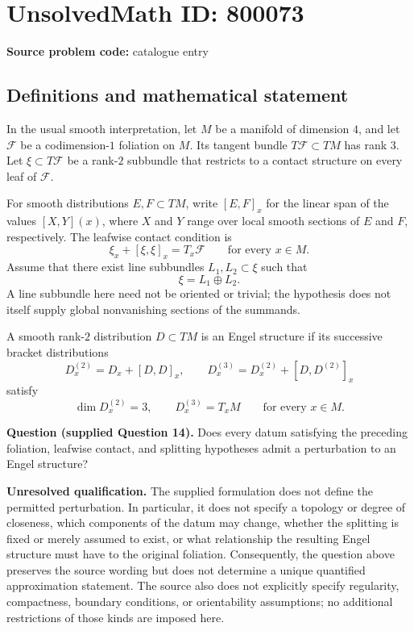 \documentclass[11pt]{article}
\begin{document}
\section*{UnsolvedMath ID: 800073}
\textbf{Source problem code:} catalogue entry
\subsection{Definitions and mathematical statement}
In the usual smooth interpretation, let \(M\) be a manifold of dimension \(4\), and let \(\mathcal F\) be a codimension-\(1\) foliation on \(M\). Its tangent bundle \(T\mathcal F\subset TM\) has rank \(3\). Let \(\xi\subset T\mathcal F\) be a rank-\(2\) subbundle that restricts to a contact structure on every leaf of \(\mathcal F\).

For smooth distributions \(E,F\subset TM\), write \([E,F]_x\) for the linear span of the values \([X,Y](x)\), where \(X\) and \(Y\) range over local smooth sections of \(E\) and \(F\), respectively. The leafwise contact condition is
\[
\xi_x+[\xi,\xi]_x=T_x\mathcal F
\qquad\text{for every }x\in M.
\]
Assume that there exist line subbundles \(L_1,L_2\subset\xi\) such that
\[
\xi=L_1\oplus L_2.
\]
A line subbundle here need not be oriented or trivial; the hypothesis does not itself supply global nonvanishing sections of the summands.

A smooth rank-\(2\) distribution \(D\subset TM\) is an Engel structure if its successive bracket distributions
\[
D^{(2)}_x=D_x+[D,D]_x,
\qquad
D^{(3)}_x=D^{(2)}_x+[D,D^{(2)}]_x
\]
satisfy
\[
\dim D^{(2)}_x=3,
\qquad
D^{(3)}_x=T_xM
\qquad\text{for every }x\in M.
\]

\textbf{Question (supplied Question 14).} Does every datum satisfying the preceding foliation, leafwise contact, and splitting hypotheses admit a perturbation to an Engel structure?

\textbf{Unresolved qualification.} The supplied formulation does not define the permitted perturbation. In particular, it does not specify a topology or degree of closeness, which components of the datum may change, whether the splitting is fixed or merely assumed to exist, or what relationship the resulting Engel structure must have to the original foliation. Consequently, the question above preserves the source wording but does not determine a unique quantified approximation statement. The source also does not explicitly specify regularity, compactness, boundary conditions, or orientability assumptions; no additional restrictions of those kinds are imposed here.
\end{document}
